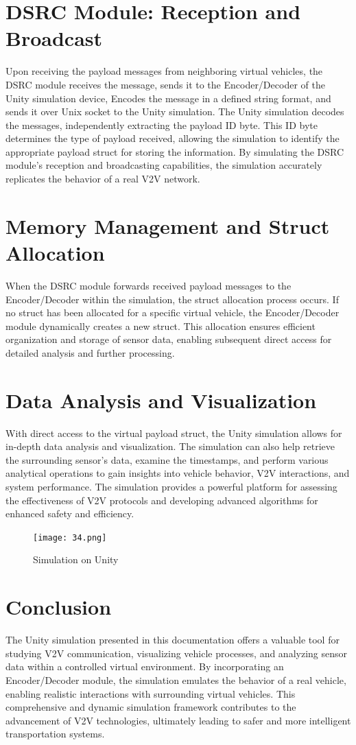 \documentclass[
12pt,
oneside, 
onehalfspacing, 
nolistspacing, 
parskip, 
chapterinoneline, 
]{AASTCOMPUTER}
\begin{document}
\section{DSRC Module: Reception and Broadcast}
Upon receiving the payload messages from neighboring virtual vehicles, the DSRC module receives the message, sends it to the Encoder/Decoder of the Unity simulation device, Encodes the message in a defined string format, and sends it over Unix socket to the Unity simulation. The Unity simulation decodes the messages, independently extracting the payload ID byte. This ID byte determines the type of payload received, allowing the simulation to identify the appropriate payload struct for storing the information. By simulating the DSRC module's reception and broadcasting capabilities, the simulation accurately replicates the behavior of a real V2V network.

\section{Memory Management and Struct Allocation}
When the DSRC module forwards received payload messages to the Encoder/Decoder within the simulation, the struct allocation process occurs. If no struct has been allocated for a specific virtual vehicle, the Encoder/Decoder module dynamically creates a new struct. This allocation ensures efficient organization and storage of sensor data, enabling subsequent direct access for detailed analysis and further processing.

\section{Data Analysis and Visualization}
With direct access to the virtual payload struct, the Unity simulation allows for in-depth data analysis and visualization. The simulation can also help retrieve the surrounding sensor's data, examine the timestamps, and perform various analytical operations to gain insights into vehicle behavior, V2V interactions, and system performance. The simulation provides a powerful platform for assessing the effectiveness of V2V protocols and developing advanced algorithms for enhanced safety and efficiency.

\clearpage
\begin{figure}[!ht]
\centering
\texttt{[image: 34.png]}
\caption[Simulation]{Simulation on Unity}
\label{fig:Simulation}
\end{figure}
\section{Conclusion}
The Unity simulation presented in this documentation offers a valuable tool for studying V2V communication, visualizing vehicle processes, and analyzing sensor data within a controlled virtual environment. By incorporating an Encoder/Decoder module, the simulation emulates the behavior of a real vehicle, enabling realistic interactions with surrounding virtual vehicles. This comprehensive and dynamic simulation framework contributes to the advancement of V2V technologies, ultimately leading to safer and more intelligent transportation systems.
\end{document}
